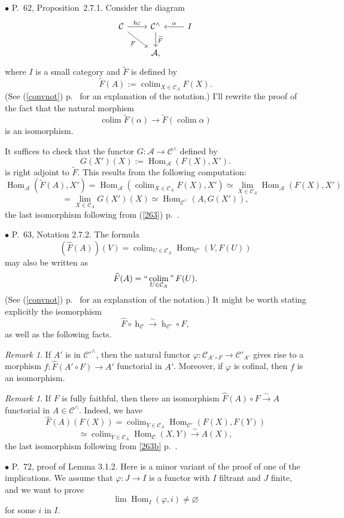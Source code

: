 \documentclass[12pt]{article}
\theoremstyle{remark}%
\newtheorem{rk}[thm]{Remark}%
\newcommand{\bu}{\bullet}
\newcommand{\n}{\noindent}
\newcommand{\cc}{\mathcal}
\newcommand{\A}{\mathcal A}
\newcommand{\C}{\mathcal C}
\newcommand{\p}{\varphi}
\newcommand{\xr}{\xrightarrow}
\newcommand{\pr}{Proposition}
\newcommand{\cn}{(See (\ref{convnot}) p.~\pageref{convnot} for an explanation of the notation.) }
\DeclareMathOperator*{\coli}{colim}
\DeclareMathOperator*{\icolim}{``\coli"}
\DeclareMathOperator{\hy}{h}
\DeclareMathOperator{\Hom}{Hom}
\DeclareMathOperator{\h}{Hom}
\begin{document}

\n$\bu$ P.~62, \pr\ 2.7.1. Consider the diagram 
%
\begin{equation}\label{271b}
\begin{tikzcd}
\C\ar{r}{\hy_\C}\ar{dr}[swap]{F}&\C^\wedge\ar{d}{\widetilde F}&I\ar{l}[swap]{\alpha}\\
&\A,
\end{tikzcd}
\end{equation} 
% 
where $I$ is a small category and $\widetilde F$ is defined by 
$$
\widetilde F(A):=\coli_{X\in\C_A}F(X). 
$$
\cn I'll rewrite the proof of the fact that the natural morphism 
%
$$
\coli\widetilde F(\alpha)\to
\widetilde F\left(\coli\alpha\right) 
$$ 
% 
is an isomorphism. 

It suffices to check that the functor $G:\A\to\C^\wedge$ defined by 
$$
G(X')(X):=\Hom_{\A}(F(X),X').
$$ 
is right adjoint to $\widetilde F$. This results from the following computation: 
$$
\Hom_{\A}\left(\widetilde F(A),X'\right)=
\Hom_{\A}\left(\coli_{X\in\C_A}F(X),X'\right)\simeq 
\lim_{X\in\C_A}\Hom_{\A}(F(X),X')
$$
$$
=\lim_{X\in\C_A}G(X')(X)\simeq\Hom_{\C^\wedge}(A,G(X')), 
$$ 
the last isomorphism following from (\ref{263}) p.~\pageref{263}. 


\n$\bu$ P.~63, Notation 2.7.2. The formula 
$$
(\widehat F(A))(V)=\coli_{U\in\C_A}\Hom_{\C'}(V,F(U))
$$
may also be written as 
$$
\widehat F(A)=\icolim_{U\in\C_A}F(U).
$$
\cn It might be worth stating explicitly the isomorphism 
$$
\widehat F\circ\hy_\C\xr\sim\hy_{\C'}\circ F,
$$
as well as the following facts. 

\begin{rk}\label{cof}
If $A'$ is in $\cc C'^\wedge$, then the natural functor $\p:\cc C_{A'\circ F}\to\cc C'_{A'}$ gives rise to a morphism $f:\widehat F(A'\circ F)\to A'$ functorial in $A'$. Moreover, if $\p$ is cofinal, then $f$ is an isomorphism. 
\end{rk} 

\begin{rk}
If $F$ is fully faithful, then there an isomorphism $\widehat F(A)\circ F\xr\sim A$ functorial in $A\in\C^\wedge$. Indeed, we have 
$$
\widehat F(A)(F(X))=\coli_{Y\in\C_A}\Hom_{\C'}(F(X),F(Y))
$$
$$
\simeq\coli_{Y\in\C_A}\Hom_\C(X,Y)\xr\sim A(X),
$$
the last isomorphism following from \eqref{263b} p.~\pageref{263b}. 
\end{rk} 


\n$\bu$ P.~72, proof of Lemma 3.1.2. Here is a minor variant of the proof of one of the implications. We assume that $\p:J\to I$ is a functor with $I$ filtrant and $J$ finite, and we want to prove 
$$
\lim\h_I(\p,i)\neq\varnothing
$$ 
for some $i$ in $I$. 
\end{document}
